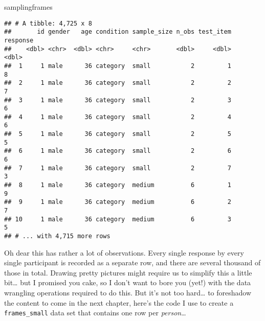 \documentclass[]{book}
\newenvironment{Shaded}{\begin{snugshade}}{\end{snugshade}}
\newcommand{\DataTypeTok}[1]{\textcolor[rgb]{0.13,0.29,0.53}{#1}}
\newcommand{\KeywordTok}[1]{\textcolor[rgb]{0.13,0.29,0.53}{\textbf{#1}}}
\newcommand{\NormalTok}[1]{#1}
\newcommand{\OperatorTok}[1]{\textcolor[rgb]{0.81,0.36,0.00}{\textbf{#1}}}
\newcommand{\StringTok}[1]{\textcolor[rgb]{0.31,0.60,0.02}{#1}}
\begin{document}
\begin{Shaded}
\begin{Highlighting}[]
\NormalTok{samplingframes}
\end{Highlighting}
\end{Shaded}

\begin{verbatim}
## # A tibble: 4,725 x 8
##       id gender   age condition sample_size n_obs test_item response
##    <dbl> <chr>  <dbl> <chr>     <chr>       <dbl>     <dbl>    <dbl>
##  1     1 male      36 category  small           2         1        8
##  2     1 male      36 category  small           2         2        7
##  3     1 male      36 category  small           2         3        6
##  4     1 male      36 category  small           2         4        6
##  5     1 male      36 category  small           2         5        5
##  6     1 male      36 category  small           2         6        6
##  7     1 male      36 category  small           2         7        3
##  8     1 male      36 category  medium          6         1        9
##  9     1 male      36 category  medium          6         2        7
## 10     1 male      36 category  medium          6         3        5
## # ... with 4,715 more rows
\end{verbatim}

Oh dear this has rather a lot of observations. Every single response by every single participant is recorded as a separate row, and there are several thousand of those in total. Drawing pretty pictures might require us to simplify this a little bit\ldots{} but I promised you cake, so I don't want to bore you (yet!) with the data wrangling operations required to do this. But it's not too hard\ldots{} to foreshadow the content to come in the next chapter, here's the code I use to create a \texttt{frames\_small} data set that contains one row per \emph{person}\ldots{}

\begin{Shaded}
\end{Shaded}
\end{document}
